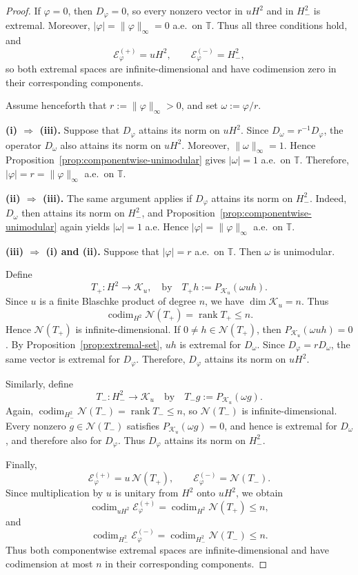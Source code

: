 \documentclass[12pt]{amsart}
\theoremstyle{definition}
\theoremstyle{remark}
\def \T{\mathbb{T}}
\newcommand{\cle}{\mathcal{E}}
\newcommand{\cln}{\mathcal{N}}
\newcommand{\clk}{\mathcal{K}}
\newcommand{\vp}{\varphi}
\numberwithin{equation}{section}
\begin{document}
\begin{proof}
If $\vp=0$, then $D_\vp=0$, so every nonzero vector in $uH^2$ and in $H^2_{-}$ is extremal. Moreover, $|\vp|=\|\vp\|_\infty=0$ a.e.\ on $\T$. Thus all three conditions hold, and
\[
\cle_\vp^{(+)}=uH^2, \qquad \cle_\vp^{(-)}=H^2_{-},
\]
so both extremal spaces are infinite-dimensional and have codimension
zero in their corresponding components.
	
Assume henceforth that $r:=\|\vp\|_\infty>0$, and set $\omega:=\vp/r$.
	
\medskip
	
\noindent
\textbf{\textup{(i)} $\Rightarrow$ \textup{(iii)}.}
Suppose that $D_\vp$ attains its norm on $uH^2$. Since $D_\omega=r^{-1}D_\vp$, the operator $D_\omega$ also attains its norm
on $uH^2$. Moreover, $\|\omega\|_\infty=1$. Hence Proposition~\ref{prop:componentwise-unimodular} gives $|\omega|=1$ a.e.\ on $\T$. Therefore, $|\vp|=r=\|\vp\|_\infty$ a.e.\ on $\T$.
	
\medskip
	
\noindent
	\textbf{\textup{(ii)} $\Rightarrow$ \textup{(iii)}.}
The same argument applies if $D_\vp$ attains its norm on $H^2_{-}$.
Indeed, $D_\omega$ then attains its norm on $H^2_{-}$, and
Proposition~\ref{prop:componentwise-unimodular} again yields
$|\omega|=1$ a.e. Hence $|\vp|=\|\vp\|_\infty$ a.e.\ on $\T$.
	
	\medskip
	
\noindent
\textbf{\textup{(iii)} $\Rightarrow$ \textup{(i)} and \textup{(ii)}.}
Suppose that $|\vp|=r$ a.e.\ on $\T$. Then $\omega$ is unimodular.
	
Define
\[
T_{+}:H^2\longrightarrow\clk_u,\quad\text{by}\quad T_{+}h:=P_{\clk_u}(\omega uh).
\]
Since $u$ is a finite Blaschke product of degree $n$, we have $\dim\clk_u=n$. Thus
\[
\operatorname{codim}_{H^2}\cln (T_{+})=\operatorname{rank}T_{+}
	\leq n.
\]
Hence $\cln (T_{+})$ is infinite-dimensional. If $0\neq h\in\cln (T_{+})$, then $P_{\clk_u}(\omega uh)=0$. By Proposition~\ref{prop:extremal-set}, $uh$ is extremal for $D_\omega$.
Since $D_\vp=rD_\omega$, the same vector is extremal for $D_\vp$.
Therefore, $D_\vp$ attains its norm on $uH^2$.
	
Similarly, define
\[
T_{-}:H^2_{-}\longrightarrow\clk_u\quad\text{by}\quad
T_{-}g:=P_{\clk_u}(\omega g).
\]
Again, $\operatorname{codim}_{H^2_{-}}\cln (T_{-})
=\operatorname{rank}T_{-}\leq n$, so $\cln (T_{-})$ is infinite-dimensional. Every nonzero $g\in\cln (T_{-})$ satisfies
$P_{\clk_u}(\omega g)=0$, and hence is extremal for $D_\omega$, and therefore also for $D_\vp$. Thus $D_\vp$ attains its norm on $H^2_{-}$.
	
Finally,
\[
\cle_\vp^{(+)}=u\,\cln (T_{+}),\qquad \cle_\vp^{(-)}=\cln (T_{-}).
\]
Since multiplication by $u$ is unitary from $H^2$ onto $uH^2$, we
obtain
\[
\operatorname{codim}_{uH^2}\cle_\vp^{(+)} =\operatorname{codim}_{H^2}\cln (T_{+})\leq n,
\]
and
\[
\operatorname{codim}_{H^2_{-}}\cle_\vp^{(-)}=\operatorname{codim}_{H^2_{-}}\cln (T_{-})\leq n.
\]
Thus both componentwise extremal spaces are infinite-dimensional and have codimension at most $n$ in their corresponding components.
\end{proof}
\end{document}
